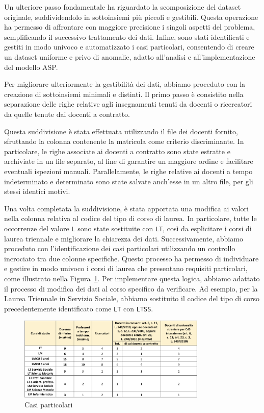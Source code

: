 Un ulteriore passo fondamentale ha riguardato la scomposizione del dataset originale, 
suddividendolo in sottoinsiemi più piccoli e gestibili. Questa operazione ha permesso 
di affrontare con maggiore precisione i singoli aspetti del problema, semplificando il 
successivo trattamento dei dati. Infine, sono stati identificati e gestiti in modo 
univoco e automatizzato i casi particolari, consentendo di creare un dataset uniforme 
e privo di anomalie, adatto all'analisi e all'implementazione del modello ASP.

Per migliorare ulteriormente la gestibilità dei dati, abbiamo proceduto con la creazione 
di sottoinsiemi minimali e distinti. Il primo passo è consistito nella separazione delle 
righe relative agli insegnamenti tenuti da docenti o ricercatori da quelle tenute dai 
docenti a contratto.

Questa suddivisione è stata effettuata utilizzando il file dei docenti fornito, 
sfruttando la colonna contenente la matricola come criterio discriminante. In particolare, 
le righe associate ai docenti a contratto sono state estratte e archiviate in un file separato, 
al fine di garantire un maggiore ordine e facilitare eventuali ispezioni manuali. 
Parallelamente, le righe relative ai docenti a tempo indeterminato e determinato sono 
state salvate anch'esse in un altro file, per gli stessi identici motivi.

Una volta completata la suddivisione, è stata apportata una modifica ai valori nella colonna 
relativa al codice del tipo di corso di laurea. In particolare, tutte le occorrenze del 
valore \texttt{L} sono state sostituite con \texttt{LT}, così da esplicitare i corsi di 
laurea triennale e migliorare la chiarezza dei dati. Successivamente, abbiamo proceduto con 
l'identificazione dei casi particolari utilizzando un controllo incrociato tra due colonne 
specifiche. Questo processo ha permesso di individuare e gestire in modo univoco i corsi 
di laurea che presentano requisiti particolari, come illustrato nella 
Figura~\ref{fig:casi_particolari}.
Per implementare questa logica, abbiamo adattato il processo di modifica dei dati al corso 
specifico da verificare. Ad esempio, per la Laurea Triennale in Servizio Sociale, abbiamo 
sostituito il codice del tipo di corso precedentemente identificato come \texttt{LT} con 
\texttt{LTSS}.

\begin{figure}[h]
    \centering
    \includegraphics[width=0.8\textwidth]{./images/tabellaministeriale.png}
    \caption{Casi particolari}
    \label{fig:casi_particolari}
\end{figure}

